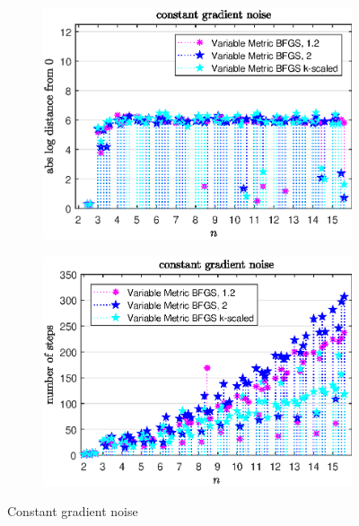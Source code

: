 \begin{figure}[H]
	\begin{subfigure}{0.49\textwidth}
		\includegraphics[width=\textwidth]{Pictures/Plots/constant_gradient_noise_comp.eps}%
	\end{subfigure}
	\begin{subfigure}{0.49\textwidth}
		\includegraphics[width=\textwidth]{Pictures/Plots/steps_constant_gradient_noise_comp.eps}%
	\end{subfigure}
	\caption{Constant gradient noise}%
	\label{fig_const_grad_noise_comp}%
\end{figure}


